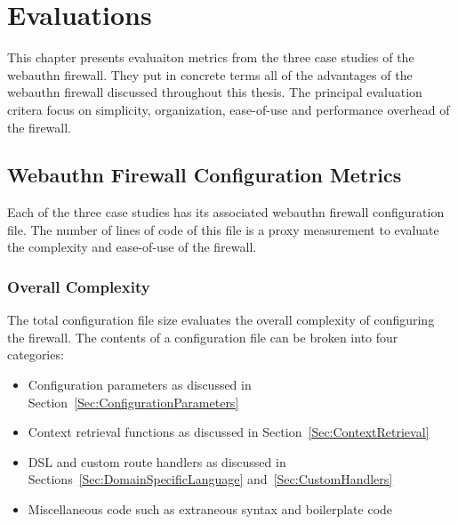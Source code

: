 
\chapter{Evaluations}\label{Chap:Evaluations}

This chapter presents evaluaiton metrics from the three case studies of the webauthn firewall. They put in concrete terms all of the advantages of the webauthn firewall discussed throughout this thesis. The principal evaluation critera focus on simplicity, organization, ease-of-use and performance overhead of the firewall.

\section{Webauthn Firewall Configuration Metrics}

Each of the three case studies has its associated webauthn firewall configuration file. The number of lines of code of this file is a proxy measurement to evaluate the complexity and ease-of-use of the firewall. 

\subsection{Overall Complexity}

The total configuration file size evaluates the overall complexity of configuring the firewall. The contents of a configuration file can be broken into four categories:

\begin{itemize}[nosep]

\item Configuration parameters as discussed in Section~\ref{Sec:ConfigurationParameters}

\item Context retrieval functions as discussed in Section~\ref{Sec:ContextRetrieval}

\item DSL and custom route handlers as discussed in Sections~\ref{Sec:DomainSpecificLanguage} and~\ref{Sec:CustomHandlers}

\item Miscellaneous code such as extraneous syntax and boilerplate code

\end{itemize}

